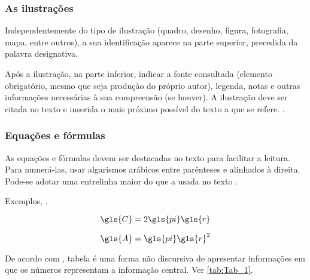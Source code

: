 \subsubsection{As ilustrações}

Independentemente do tipo de ilustração (quadro, desenho, figura, fotografia, mapa, entre outros), a sua identificação aparece na parte superior, precedida da palavra designativa.

\begin{citacao}
    Após a ilustração, na parte inferior, indicar a fonte consultada (elemento obrigatório, mesmo que seja produção do próprio autor), legenda, notas e outras informações necessárias à sua compreensão (se houver). A ilustração deve ser citada no texto e inserida o mais próximo possível do texto a que se refere. \cite[p. 11]{NBR14724:2011}.
\end{citacao}

\subsubsection{Equações e fórmulas}

As equações e fórmulas devem ser destacadas no texto para facilitar a leitura.  Para numerá-las, usar algarismos arábicos entre parênteses e alinhados à direita. Pode-se adotar uma entrelinha maior do que a usada no texto \cite{NBR14724:2011}.

Exemplos, .

\begin{equation}\label{eq:Eq_1}
\gls{C} = 2 \gls{pi} \gls{r}
\end{equation}

\begin{equation}\label{eq:Eq_2}
\gls{A} = \gls{pi} \gls{r}^2
\end{equation}


De acordo com \textcite{ibge1993}, tabela é uma forma não discursiva de apresentar informações em que os números representam a informação central. Ver \autoref{tab:Tab_1}.

